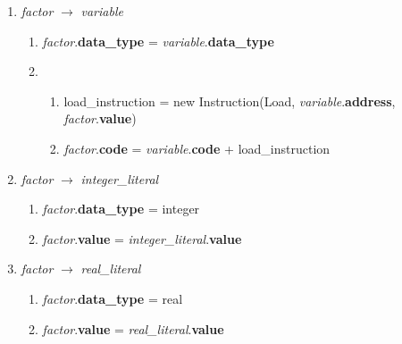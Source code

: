 \documentclass[12pt]{article}
\begin{document}
\begin{enumerate}[label = \arabic*.]
\item \textit{ factor } $\rightarrow$ \textit{ variable }
\begin{enumerate}[label = \roman*.]
\item \textit{factor}.\textbf{data\_type} = \textit{variable}.\textbf{data\_type}
\item \begin{enumerate}[label = \alph*.]
\item load\_instruction = new Instruction(Load, \textit{variable}.\textbf{address}, \textit{factor}.\textbf{value})
\item \textit{factor}.\textbf{code} = \textit{variable}.\textbf{code} + load\_instruction
\end{enumerate}
\end{enumerate}

\item \textit{ factor } $\rightarrow$ \textit{ integer\_literal }
\begin{enumerate}[label = \roman*.]
\item \textit{factor}.\textbf{data\_type} = integer
\item \textit{factor}.\textbf{value} = \textit{integer\_literal}.\textbf{value}
\end{enumerate}

\item \textit{ factor } $\rightarrow$ \textit{ real\_literal }
\begin{enumerate}[label = \roman*.]
\item \textit{factor}.\textbf{data\_type} = real
\item \textit{factor}.\textbf{value} = \textit{real\_literal}.\textbf{value}
\end{enumerate}
\end{enumerate}
\end{document}
